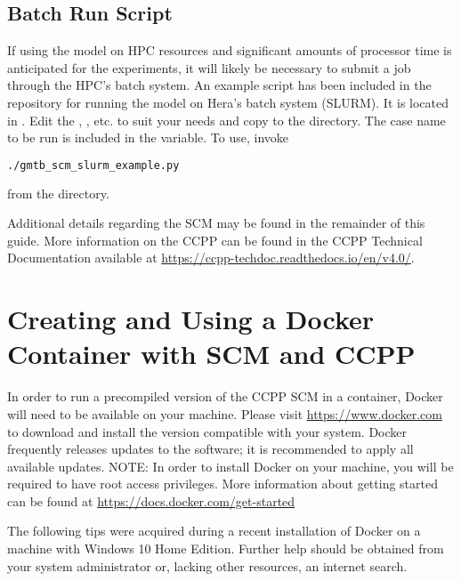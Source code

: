 \subsection{Batch Run Script}

If using the model on HPC resources and significant amounts of processor time is anticipated for the experiments, it will likely be necessary to submit a job through the HPC's batch system. An example script has been included in the repository for running the model on Hera's batch system (SLURM). It is located in . Edit the , , etc. to suit your needs and copy to the  directory. The case name to be run is included in the  variable. To use, invoke
\begin{lstlisting}[language=bash]
./gmtb_scm_slurm_example.py
\end{lstlisting}
from the  directory.

Additional details regarding the SCM may be found in the remainder of this guide. More information on the CCPP can be found in the CCPP Technical Documentation available at \url{https://ccpp-techdoc.readthedocs.io/en/v4.0/}.

\section{Creating and Using a Docker Container with SCM and CCPP}
\label{docker}

In order to run a precompiled version of the CCPP SCM in a container, Docker will need to be available on your machine. Please visit \url{https://www.docker.com} to download and install the version compatible with your system. Docker frequently releases updates to the software; it is recommended to apply all available updates. NOTE: In order to install Docker on your machine, you will be required to have root access privileges. More information about getting started can be found at \url{https://docs.docker.com/get-started}

The following tips were acquired during a recent installation of Docker on a machine with Windows 10 Home Edition. Further help should be obtained from your system administrator or, lacking other resources, an internet search.

